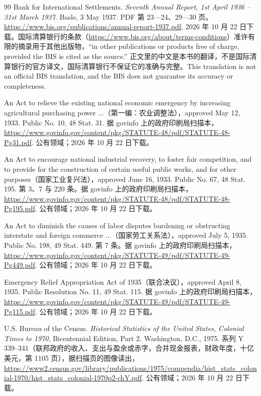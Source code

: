 \begin{thebibliography}{99}
 Bank for International Settlements. \emph{Seventh Annual Report, 1st April 1936 -- 31st March 1937}. Basle, 3 May 1937. PDF 第 23—24、29—30 页。\url{https://www.bis.org/publications/annual-report-1937.pdf}. 2026 年 10 月 22 日下载。国际清算银行的条款（\url{https://www.bis.org/about/terms-conditions}）准许有限的摘录用于其他出版物，“in other publications or products free of charge, provided the BIS is cited as the source.” 正文里的中文是本书的翻译，不是国际清算银行的官方译文，国际清算银行不保证它的准确与完整。This translation is not an official BIS translation, and the BIS does not guarantee its accuracy or completeness.

 An Act to relieve the existing national economic emergency by increasing agricultural purchasing power ...（第一编：农业调整法），approved May 12, 1933. Public No. 10, 48 Stat. 31. 据 govinfo 上的政府印刷局扫描本，\url{https://www.govinfo.gov/content/pkg/STATUTE-48/pdf/STATUTE-48-Pg31.pdf}. 公有领域；2026 年 10 月 22 日下载。

 An Act to encourage national industrial recovery, to foster fair competition, and to provide for the construction of certain useful public works, and for other purposes（国家工业复兴法），approved June 16, 1933. Public No. 67, 48 Stat. 195. 第 3、7 与 220 条。据 govinfo 上的政府印刷局扫描本，\url{https://www.govinfo.gov/content/pkg/STATUTE-48/pdf/STATUTE-48-Pg195.pdf}. 公有领域；2026 年 10 月 22 日下载。

 An Act to diminish the causes of labor disputes burdening or obstructing interstate and foreign commerce ...（国家劳工关系法），approved July 5, 1935. Public No. 198, 49 Stat. 449. 第 7 条。据 govinfo 上的政府印刷局扫描本，\url{https://www.govinfo.gov/content/pkg/STATUTE-49/pdf/STATUTE-49-Pg449.pdf}. 公有领域；2026 年 10 月 22 日下载。

 Emergency Relief Appropriation Act of 1935（联合决议），approved April 8, 1935. Public Resolution No. 11, 49 Stat. 115. 据 govinfo 上的政府印刷局扫描本，\url{https://www.govinfo.gov/content/pkg/STATUTE-49/pdf/STATUTE-49-Pg115.pdf}. 公有领域；2026 年 10 月 22 日下载。

 U.S. Bureau of the Census. \emph{Historical Statistics of the United States, Colonial Times to 1970}, Bicentennial Edition, Part 2. Washington, D.C., 1975. 系列 Y 339--341（联邦政府的收入、支出与盈余或赤字，合并现金报表，财政年度，十亿美元，第 1105 页），据扫描页的图像读出，\url{https://www2.census.gov/library/publications/1975/compendia/hist_stats_colonial-1970/hist_stats_colonial-1970p2-chY.pdf}. 公有领域；2026 年 10 月 22 日下载。


\end{thebibliography}
